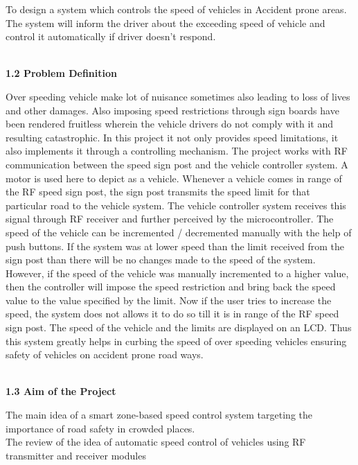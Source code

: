 \documentclass[a4paper,12pt, English]{article}
\newcommand\tab[1][1cm]{\hspace*{#1}}
\begin{document}
\begin{normalsize}
\tabIn To design a system which controls the speed of vehicles in Accident prone areas. 
\\
\tab The system will inform the driver about the exceeding speed of vehicle and control it automatically if driver doesn’t respond.
\\
\\
\begin{large}
\textbf{1.2 Problem Definition}
\end{large}
\newline
\tab Over speeding vehicle make lot of nuisance sometimes also leading to loss of lives
and other damages. Also imposing speed restrictions through sign boards have
been rendered fruitless wherein the vehicle drivers do not comply with it and
resulting catastrophic.
In this project it not only provides speed limitations, it also implements it through
a controlling mechanism. The project works with RF communication between the
speed sign post and the vehicle controller system. A motor is used here to depict as
a vehicle. Whenever a vehicle comes in range of the RF speed sign post, the sign
post transmits the speed limit for that particular road to the vehicle system. The
vehicle controller system receives this signal through RF receiver and further
perceived by the microcontroller. The speed of the vehicle can be incremented /
decremented manually with the help of push buttons. If the system was at lower
speed than the limit received from the sign post than there will be no changes made
to the speed of the system. However, if the speed of the vehicle was manually
incremented to a higher value, then the controller will impose the speed restriction
and bring back the speed value to the value specified by the limit. Now if the user
tries to increase the speed, the system does not allows it to do so till it is in range of
the RF speed sign post. The speed of the vehicle and the limits are displayed on an
LCD. Thus this system greatly helps in curbing the speed of over speeding vehicles
ensuring safety of vehicles on accident prone road ways.\\
\\
\begin{large}
\textbf{1.3 Aim of the Project}
\end{large}
\newline
\tab The main idea of a smart zone-based speed control system
targeting the importance of road safety in crowded places.\\
The review of the idea of automatic speed
control of vehicles using RF transmitter and receiver
modules



\end{normalsize}
\end{document}
